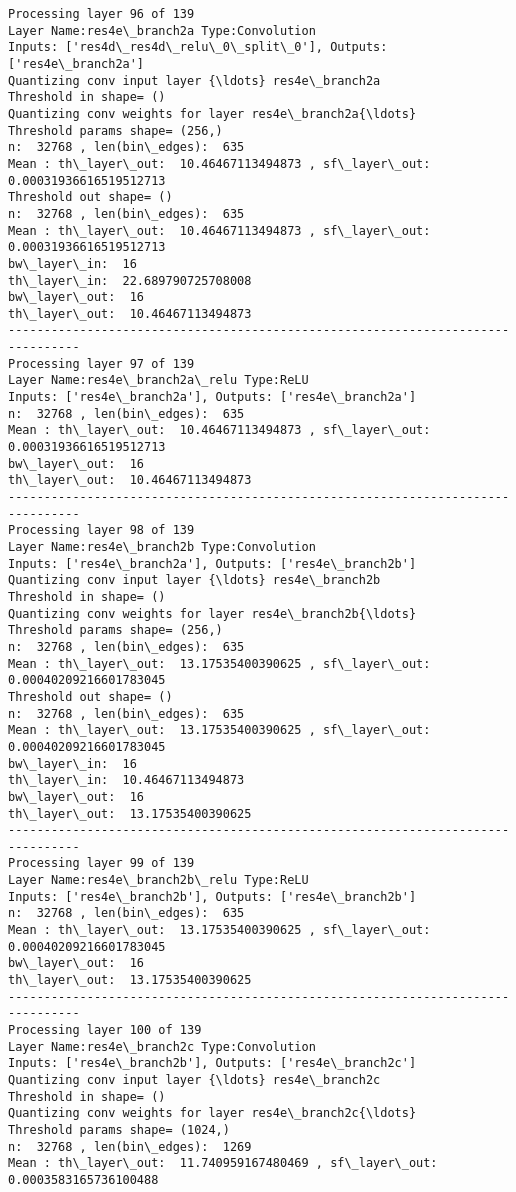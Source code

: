 \documentclass[11pt]{article}
\begin{document}
\begin{Verbatim}[commandchars=\\\{\}]
Processing layer 96 of 139
Layer Name:res4e\_branch2a Type:Convolution
Inputs: ['res4d\_res4d\_relu\_0\_split\_0'], Outputs: ['res4e\_branch2a']
Quantizing conv input layer {\ldots} res4e\_branch2a
Threshold in shape= ()
Quantizing conv weights for layer res4e\_branch2a{\ldots}
Threshold params shape= (256,)
n:  32768 , len(bin\_edges):  635
Mean : th\_layer\_out:  10.46467113494873 , sf\_layer\_out:  0.00031936616519512713
Threshold out shape= ()
n:  32768 , len(bin\_edges):  635
Mean : th\_layer\_out:  10.46467113494873 , sf\_layer\_out:  0.00031936616519512713
bw\_layer\_in:  16
th\_layer\_in:  22.689790725708008
bw\_layer\_out:  16
th\_layer\_out:  10.46467113494873
--------------------------------------------------------------------------------
Processing layer 97 of 139
Layer Name:res4e\_branch2a\_relu Type:ReLU
Inputs: ['res4e\_branch2a'], Outputs: ['res4e\_branch2a']
n:  32768 , len(bin\_edges):  635
Mean : th\_layer\_out:  10.46467113494873 , sf\_layer\_out:  0.00031936616519512713
bw\_layer\_out:  16
th\_layer\_out:  10.46467113494873
--------------------------------------------------------------------------------
Processing layer 98 of 139
Layer Name:res4e\_branch2b Type:Convolution
Inputs: ['res4e\_branch2a'], Outputs: ['res4e\_branch2b']
Quantizing conv input layer {\ldots} res4e\_branch2b
Threshold in shape= ()
Quantizing conv weights for layer res4e\_branch2b{\ldots}
Threshold params shape= (256,)
n:  32768 , len(bin\_edges):  635
Mean : th\_layer\_out:  13.17535400390625 , sf\_layer\_out:  0.00040209216601783045
Threshold out shape= ()
n:  32768 , len(bin\_edges):  635
Mean : th\_layer\_out:  13.17535400390625 , sf\_layer\_out:  0.00040209216601783045
bw\_layer\_in:  16
th\_layer\_in:  10.46467113494873
bw\_layer\_out:  16
th\_layer\_out:  13.17535400390625
--------------------------------------------------------------------------------
Processing layer 99 of 139
Layer Name:res4e\_branch2b\_relu Type:ReLU
Inputs: ['res4e\_branch2b'], Outputs: ['res4e\_branch2b']
n:  32768 , len(bin\_edges):  635
Mean : th\_layer\_out:  13.17535400390625 , sf\_layer\_out:  0.00040209216601783045
bw\_layer\_out:  16
th\_layer\_out:  13.17535400390625
--------------------------------------------------------------------------------
Processing layer 100 of 139
Layer Name:res4e\_branch2c Type:Convolution
Inputs: ['res4e\_branch2b'], Outputs: ['res4e\_branch2c']
Quantizing conv input layer {\ldots} res4e\_branch2c
Threshold in shape= ()
Quantizing conv weights for layer res4e\_branch2c{\ldots}
Threshold params shape= (1024,)
n:  32768 , len(bin\_edges):  1269
Mean : th\_layer\_out:  11.740959167480469 , sf\_layer\_out:  0.0003583165736100488

\end{Verbatim}
\end{document}
